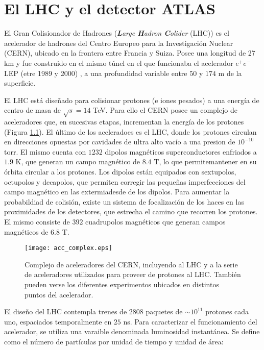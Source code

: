 \chapter{El LHC y el detector ATLAS}



El Gran Colisionador de Hadrones (\textit{\textbf{L}arge \textbf{H}adron \textbf{C}olider} (LHC)) \cite{Evans:1129806} es el acelerador de hadrones del Centro Europeo para la Investigación Nuclear (CERN), ubicado en la frontera entre Francia y Suiza. Posee una longitud de 27 km y fue construido en el mismo túnel en el que funcionaba el acelerador $e^{+}e^{-}$ LEP (etre 1989 y 2000) \cite{LEPbook}, a una profundidad variable entre $50$ y $174$ m de la superficie.

El LHC está diseñado para colisionar protones (e iones pesados) a una energía de centro de masa de $\sqrt{s}=14$ TeV. Para ello el CERN posee un complejo de aceleradores que, en sucesivas etapas, incrementan la energía de los protones (Figura \ref{acc_complex}). El último de los aceleradoes es el LHC, donde los protones circulan en direcciones opuestas por cavidades de ultra alto vacío a una presion de $10^{-10}$ torr. El mismo cuenta con $1232$ dipolos magnéticos superconductores enfriados a $1.9$ K, que generan un campo magnético de $8.4$ T, lo que permitemantener en su órbita circular a los protones. Los dipolos están equipados con sextupolos, octupolos y decapolos, que permiten corregir las pequeñas imperfecciones del campo magnético en las extermiadesde de los dipolos. Para aumentar la probabildiad de colisión, existe un sistema de focalización de los haces en las proximidades de los detectores, que estrecha el camino que recorren los protones. El mismo consiste de $392$ cuadrupolos magnéticos que generan campos magnéticos de $6.8$ T. 

\begin{figure}[ht]
\centering
\texttt{[image: acc\_complex.eps]}
\caption{Complejo de aceleradores del CERN, incluyendo al LHC y a la serie de aceleradores utilizados para proveer de protones al LHC. También pueden verse los diferentes experimentos ubicados en distintos puntos del acelerador.}
\label{acc_complex}
\end{figure}

El diseño del LHC contempla trenes de $2808$ paquetes de $\sim 10^{11}$ protones cada uno, espaciados temporalmente en $25$ ns. Para caracterizar el funcionamiento del acelerador, se utiliza una varaible denominada luminosidad instantánea. Se define como el número de partículas por unidad de tiempo y unidad de área:

